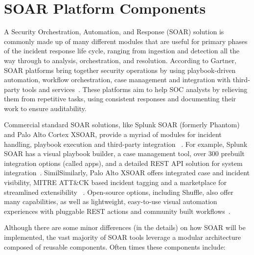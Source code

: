 \section{SOAR Platform Components}

A Security Orchestration, Automation, and Response (SOAR) solution is commonly made up of many different modules that are useful for primary phases of the incident response life cycle, ranging from ingestion and detection all the way through to analysis, orchestration, and resolution. According to Gartner, SOAR platforms bring together security operations by using playbook-driven automation, workflow orchestration, case management and integration with third-party tools and services~\cite{gartner-siem-soar}. These platforms aim to help SOC analysts by relieving them from repetitive tasks, using consistent responses and documenting their work to ensure auditability.

Commercial standard SOAR solutions, like Splunk SOAR (formerly Phantom) and Palo Alto Cortex XSOAR, provide a myriad of modules for incident handling, playbook execution and third-party integration ~\cite{splunk, paloalto}. For example, Splunk SOAR has a visual playbook builder, a case management tool, over 300 prebuilt integration options (called apps), and a detailed REST API solution for system integration~\cite{splunk}. SimilSimilarly, Palo Alto XSOAR offers integrated case and incident visibility, MITRE ATT\&CK based incident tagging and a marketplace for streamlined extensibility ~\cite{paloalto}. Open-source options, including Shuffle, also offer many capabilities, as well as lightweight, easy-to-use visual automation experiences with pluggable REST actions and community built workflows~\cite{techtarget}.

Although there are some minor differences (in the details) on how SOAR will be implemented, the vast majority of SOAR tools leverage a modular architecture composed of reusable components. Often times these components include:

